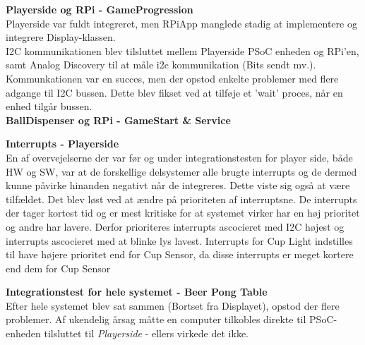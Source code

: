 \documentclass[Rapport/Rapport_main.tex]{subfiles}
\begin{document}
\textbf{Playerside og RPi - GameProgression} \\
Playerside var fuldt integreret, men RPiApp manglede stadig at implementere og integrere Display-klassen. \\
I2C kommunikationen blev tilsluttet mellem Playerside PSoC enheden og RPi'en, samt Analog Discovery til at måle i2c kommunikation (Bits sendt mv.). \\
Kommunkationen var en succes, men der opstod enkelte problemer med flere adgange til I2C bussen. Dette blev fikset ved at tilføje et 'wait' proces, når en enhed tilgår bussen. \\ 
\textbf{BallDispenser og RPi - GameStart \& Service}

\textbf{Interrupts - Playerside}\\
En af overvejelserne der var før og under integrationstesten for player side, både HW og SW, var at de forskellige delsystemer alle brugte interrupts og de dermed kunne påvirke hinanden negativt når de integreres. Dette viste sig også at være tilfældet. Det blev løst ved at ændre på prioriteten af interruptsne. De interrupts der tager kortest tid og er mest kritiske for at systemet virker har en høj prioritet og andre har lavere. Derfor prioriteres interrupts ascocieret med I2C højest og interrupts ascocieret med at blinke lys lavest. Interrupts for Cup Light indstilles til have højere prioritet end for Cup Sensor, da disse interrupts er meget kortere end dem for Cup Sensor 

\textbf{Integrationstest for hele systemet - Beer Pong Table}\\
Efter hele systemet blev sat sammen (Bortset fra Displayet), opstod der flere problemer. Af ukendelig årsag måtte en computer tilkobles direkte til PSoC-enheden tilsluttet til \textit{Playerside} - ellers virkede det ikke. 
\end{document}
